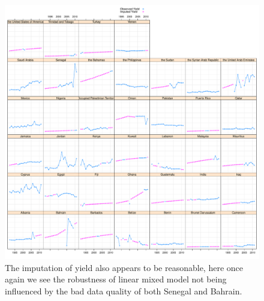\documentclass[nojss]{jss}\usepackage[]{graphicx}\usepackage[]{color}
\makeatletter
\def\maxwidth{ %
  \ifdim\Gin@nat@width>\linewidth
    \linewidth
  \else
    \Gin@nat@width
  \fi
}
\newenvironment{knitrout}{}{} %
\makeatother
\begin{document}
\begin{knitrout}
\color{fgcolor}\begin{figure}[!ht]


{\centering \includegraphics[width=\maxwidth]{figure/okra-yield-imputed} 

}

\caption[The imputation of yield also appears to be reasonable, here once again we see the robustness of linear mixed model not being influenced by the bad data quality of both Senegal and Bahrain]{The imputation of yield also appears to be reasonable, here once again we see the robustness of linear mixed model not being influenced by the bad data quality of both Senegal and Bahrain.\label{fig:okra-yield-imputed}}
\end{figure}


\end{knitrout}
\end{document}
